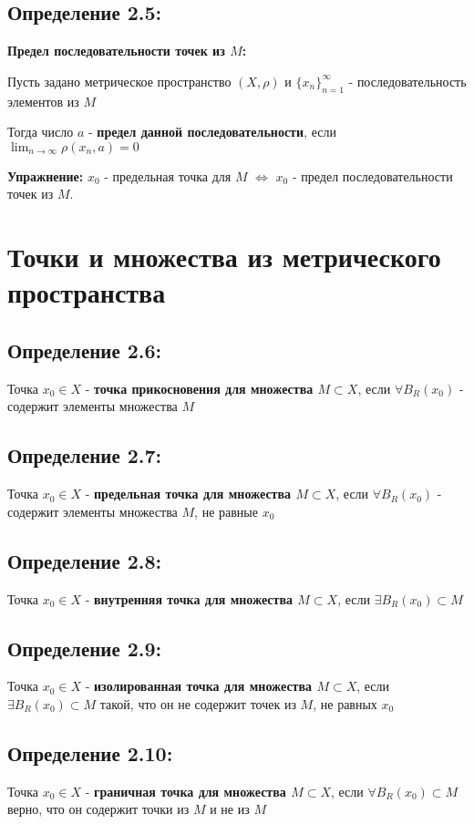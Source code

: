 \documentclass[12pt, english]{article}
\begin{document}
\newpage
\subsection*{Определение 2.5:}
	\textbf{Предел последовательности точек из $M$:}
	
	Пусть задано метрическое пространство $(X,\rho)$ и $\{{x_n}\}_{n = 1}^{\infty}$ - последовательность элементов из $M$
	
	Тогда число $a$ - \textbf{предел данной последовательности}, если $\lim_{n \to \infty} \rho(x_n , a) = 0$
	
	
\textbf{Упражнение:}
	$x_0$ - предельная точка для $M$ $\Leftrightarrow$ $x_0$ - предел последовательности точек из $M$.
	
\section{Точки и множества из метрического пространства}	

\subsection*{Определение 2.6:}
	 Точка $x_0 \in X$ - \textbf{точка прикосновения для множества $M \subset X$}, если $\forall B_R (x_0)$ - содержит элементы множества $M$
	    
\subsection*{Определение 2.7:}
	 Точка $x_0 \in X$ - \textbf{предельная точка для множества $M \subset X$}, если $\forall B_R (x_0)$ - содержит элементы множества $M$,
	 не равные $x_0$
	
\subsection*{Определение 2.8:}
	 Точка $x_0 \in X$ - \textbf{внутренняя точка для множества $M \subset X$}, если $\exists B_R (x_0) \subset M$
	
\subsection*{Определение 2.9:}
	 Точка $x_0 \in X$ - \textbf{изолированная точка для множества $M \subset X$}, если $\exists B_R (x_0) \subset M$ такой, что
	 он не содержит точек из $M$, не равных $x_0$

\subsection*{Определение 2.10:}
	 Точка $x_0 \in X$ - \textbf{граничная точка для множества $M \subset X$}, если $\forall B_R (x_0) \subset M$ 
	 верно, что он содержит точки из $M$ и не из $M$
\end{document}
